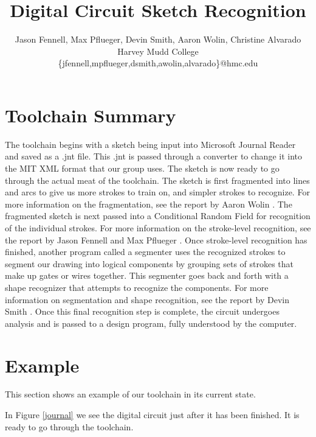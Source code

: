\documentclass{acmsiggraph}               %
\title{Digital Circuit Sketch Recognition}
\author{Jason Fennell, Max Pflueger, Devin Smith, Aaron Wolin, Christine Alvarado\\Harvey Mudd College\\\{jfennell,mpflueger,dsmith,awolin,alvarado\}@hmc.edu}
\begin{document}

\maketitle

\section*{Toolchain Summary}

The toolchain begins with a sketch being input into Microsoft Journal
Reader and saved as a .jnt file.  This .jnt is passed through a
converter to change it into the MIT XML format that our group uses.
The sketch is now ready to go through the actual meat of the
toolchain.  The sketch is first fragmented into lines and arcs to give
us more strokes to train on, and simpler strokes to recognize.  For
more information on the fragmentation, see the report by Aaron Wolin
\cite{wolin:fragmenter}.  The fragmented sketch is next passed into a
Conditional Random Field for recognition of the individual strokes.
For more information on the stroke-level recognition, see the report
by Jason Fennell and Max Pflueger \cite{fennellPflueger:CRF}.  Once
stroke-level recognition has finished, another program called a
segmenter uses the recognized strokes to segment our drawing into
logical components by grouping sets of strokes that make up gates or
wires together.  This segmenter goes back and forth with a shape
recognizer that attempts to recognize the components.  For more
information on segmentation and shape recognition, see the report by
Devin Smith \cite{smith:segmentation}.  Once this final recognition
step is complete, the circuit undergoes analysis and is passed to a
design program, fully understood by the computer.

\section*{Example}

This section shows an example of our toolchain in its current state.

In Figure \ref{journal} we see the digital circuit just after it has been finished.  
It is ready to go through the toolchain.
\end{document}
